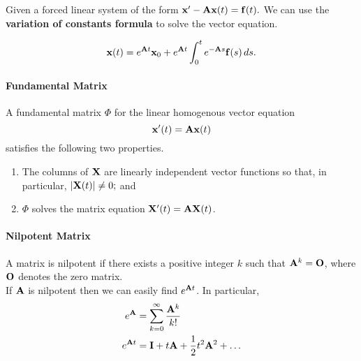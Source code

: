 \bigskip
Given a forced linear system of the form \(\mathbf{x}' - \mathbf{A}\mathbf{x}(t) = \mathbf{f}(t).\) We can use the \textbf{variation of constants formula} to solve the vector equation.

\[\mathbf{x}(t) = e^{\mathbf{A} t}\mathbf{x}_0 + e^{\mathbf{A} t} \int_0^t e^{-\mathbf{A} s}\mathbf{f}(s) \, ds.\]

\paragraph{Fundamental Matrix}
A fundamental matrix \(\Phi\) for the linear homogenous vector equation
\[\mathbf{x}'(t) = \mathbf{A}\mathbf{x}(t)\]
satisfies the following two properties.
\begin{enumerate}
    \item The columns of \(\mathbf{X}\) are linearly independent vector functions so that, in particular, \(|\mathbf{X}(t)| \neq 0;\) and
    \item \(\Phi\) solves the matrix equation \(\mathbf{X}'(t) = \mathbf{A}\mathbf{X}(t)\).
\end{enumerate}


\paragraph{Nilpotent Matrix}
A matrix is nilpotent if there exists a positive integer \(k\) such that \(\mathbf{A}^k = \mathbf{O}\), where \(\mathbf{O}\) denotes the zero matrix. \\

If \(\mathbf{A}\) is nilpotent then we can easily find \(e^{\mathbf{A} t}\). In particular,
\begin{align*}
    e^{\mathbf{A}}   & = \sum_{k=0}^{\infty} \frac{\mathbf{A}^k}{k!}     \\
    e^{\mathbf{A} t} & = \mathbf{I} + t\mathbf{A} + \frac{1}{2}t^2\mathbf{A}^2 + \dots
\end{align*}


